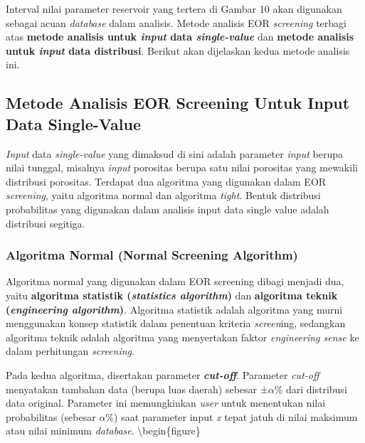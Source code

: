 \documentclass[
]{book}
\begin{document}
Interval nilai parameter reservoir yang tertera di Gambar 10 akan digunakan sebagai acuan \emph{database} dalam analisis. Metode analisis EOR \emph{screening} terbagi atas \textbf{metode analisis untuk \emph{input} data \emph{single-value}} dan \textbf{metode analisis untuk \emph{input} data distribusi}. Berikut akan dijelaskan kedua metode analisis ini.

\hypertarget{metode-analisis-eor-screening-untuk-input-data-single-value}{%
\subsection{Metode Analisis EOR Screening Untuk Input Data Single-Value}\label{metode-analisis-eor-screening-untuk-input-data-single-value}}

\emph{Input} data \emph{single-value} yang dimaksud di sini adalah parameter \emph{input} berupa nilai tunggal, misalnya \emph{input} porositas berupa satu nilai porositas yang mewakili distribusi porositas. Terdapat dua algoritma yang digunakan dalam EOR \emph{screening}, yaitu algoritma normal dan algoritma \emph{tight}. Bentuk distribusi probabilitas yang digunakan dalam analisis input data single value adalah distribusi segitiga.

\hypertarget{algoritma-normal-normal-screening-algorithm}{%
\subsubsection{Algoritma Normal (Normal Screening Algorithm)}\label{algoritma-normal-normal-screening-algorithm}}

Algoritma normal yang digunakan dalam EOR screening dibagi menjadi dua, yaitu \textbf{algoritma statistik (\emph{statistics algorithm})} dan \textbf{algoritma teknik (\emph{engineering algorithm})}. Algoritma statistik adalah algoritma yang murni menggunakan konsep statistik dalam penentuan kriteria \emph{screen}ing, sedangkan algoritma teknik adalah algoritma yang menyertakan faktor \emph{engineering sense} ke dalam perhitungan \emph{screening}.

Pada kedua algoritma, disertakan parameter \textbf{\emph{cut-off}}. Parameter \emph{cut-off} menyatakan tambahan data (berupa luas daerah) sebesar ±\(\alpha\)\% dari distribusi data original. Parameter ini memungkinkan \emph{user} untuk menentukan nilai probabilitas (sebesar \(\alpha\)\%) saat parameter input \emph{x} tepat jatuh di nilai maksimum atau nilai minimum \emph{database}.
\textbackslash begin\{figure\}
\end{document}
